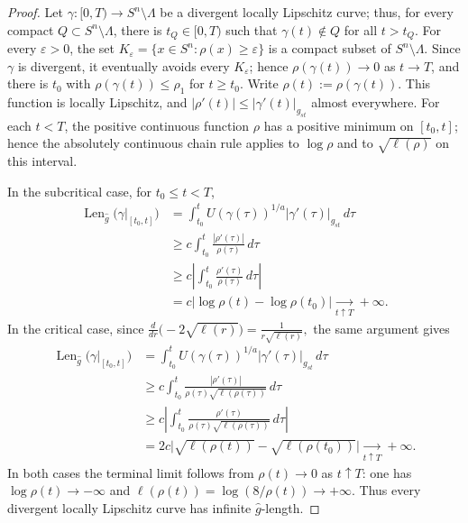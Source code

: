 \documentclass[12pt,oneside,a4paper]{article}
\theoremstyle{mytheorem}
\theoremstyle{remark}
\theoremstyle{definition}
\begin{document}
\begin{proof}
Let $\gamma:[0,T)\to S^n\setminus\Lambda$ be a divergent locally
Lipschitz curve; thus, for every compact $Q\subset S^n\setminus\Lambda$,
there is $t_Q\in[0,T)$ such that $\gamma(t)\notin Q$ for all $t>t_Q$.
For every $\varepsilon>0$, the set
$K_\varepsilon=\{x\in S^n:\rho(x)\ge\varepsilon\}$ is a compact
subset of $S^n\setminus\Lambda$.  Since $\gamma$ is
divergent, it eventually avoids every $K_\varepsilon$; hence
$\rho(\gamma(t))\to0$ as $t\to T$, and there is $t_0$ with
$\rho(\gamma(t))\le\rho_1$ for $t\ge t_0$.  Write
$\rho(t):=\rho(\gamma(t))$.  This function is locally Lipschitz, and
$|\rho'(t)|\le|\gamma'(t)|_{g_{st}}$ almost everywhere.  For each
$t<T$, the positive continuous function $\rho$ has a positive minimum
on $[t_0,t]$; hence the absolutely continuous chain rule applies to
$\log\rho$ and to $\sqrt{\ell(\rho)}$ on this interval.

In the subcritical case, for $t_0\le t<T$,
\[
\begin{aligned}
 \operatorname{Len}_{\widehat g}
 \bigl(\gamma|_{[t_0,t]}\bigr)
 &=\int_{t_0}^{t}U(\gamma(\tau))^{1/a}
   |\gamma'(\tau)|_{g_{st}}\,d\tau\\
 &\ge c\int_{t_0}^{t}\frac{|\rho'(\tau)|}{\rho(\tau)}\,d\tau\\
 &\ge c\left|\int_{t_0}^{t}
   \frac{\rho'(\tau)}{\rho(\tau)}\,d\tau\right|\\
 &=c\bigl|\log\rho(t)-\log\rho(t_0)\bigr|
 \xrightarrow[t\uparrow T]{}+\infty.
\end{aligned}
\]
In the critical case, since
$\frac{d}{dr}\bigl(-2\sqrt{\ell(r)}\bigr)
=\frac1{r\sqrt{\ell(r)}},$
the same argument gives
\[
\begin{aligned}
 \operatorname{Len}_{\widehat g}
 \bigl(\gamma|_{[t_0,t]}\bigr)
 &=\int_{t_0}^{t}U(\gamma(\tau))^{1/a}
   |\gamma'(\tau)|_{g_{st}}\,d\tau\\
 &\ge c\int_{t_0}^{t}
   \frac{|\rho'(\tau)|}
        {\rho(\tau)\sqrt{\ell(\rho(\tau))}}\,d\tau\\
 &\ge c\left|\int_{t_0}^{t}
   \frac{\rho'(\tau)}
        {\rho(\tau)\sqrt{\ell(\rho(\tau))}}\,d\tau\right|\\
 &=2c\bigl|\sqrt{\ell(\rho(t))}
          -\sqrt{\ell(\rho(t_0))}\bigr|
 \xrightarrow[t\uparrow T]{}+\infty.
\end{aligned}
\]
In both cases the terminal limit follows from
$\rho(t)\to0$ as $t\uparrow T$: one has
$\log\rho(t)\to-\infty$ and
$\ell(\rho(t))=\log(8/\rho(t))\to+\infty$.
Thus every
divergent locally Lipschitz curve has infinite $\widehat g$-length.


\end{proof}
\end{document}
